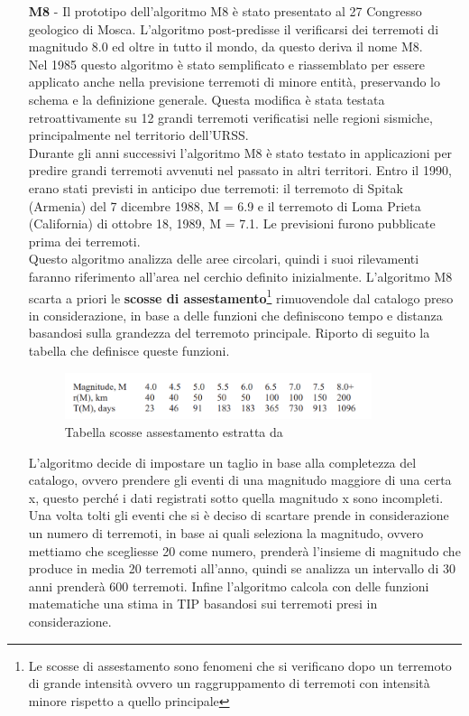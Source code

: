 \begin{itemize}
    \item[\textbf{M8} -] Il prototipo dell'algoritmo M8 \`e stato presentato al 27 Congresso geologico di Mosca.
L'algoritmo post-predisse il verificarsi dei terremoti di magnitudo 8.0 ed oltre in tutto il mondo, da questo deriva il nome M8.\\
Nel 1985 questo algoritmo \`e stato semplificato e riassemblato per essere applicato anche nella previsione terremoti di minore entit\`a, preservando lo schema e la definizione generale. Questa modifica \`e stata testata retroattivamente su 12 grandi terremoti verificatisi nelle regioni sismiche, principalmente nel territorio dell'URSS.\\
Durante gli anni successivi l'algoritmo M8 \`e stato testato in applicazioni per predire grandi terremoti avvenuti nel passato in altri territori. Entro il 1990, erano stati previsti in anticipo due terremoti: il terremoto di Spitak (Armenia) del 7 dicembre 1988, M = 6.9 e il terremoto di Loma Prieta (California) di ottobre 18, 1989, M = 7.1. Le previsioni furono pubblicate prima dei terremoti. \cite{algortimoM8}\\
Questo algoritmo analizza delle aree circolari, quindi i suoi rilevamenti faranno riferimento all'area nel cerchio definito inizialmente. L'algoritmo M8 scarta a priori le \textbf{scosse di assestamento}\footnote{Le scosse di assestamento sono fenomeni che si verificano dopo un terremoto di grande intensit\`a ovvero un raggruppamento di terremoti con intensit\`a minore rispetto a quello principale} rimuovendole dal catalogo preso in considerazione, in base a delle funzioni che definiscono tempo e distanza basandosi sulla grandezza del terremoto principale. Riporto di seguito la tabella che definisce queste funzioni.

\begin{figure}[H]
   \centering
   \includegraphics[width=0.850\textwidth]{images/TabellaScosseAssestamento.png}
   \caption{Tabella scosse assestamento estratta da \cite{M8Manual}}
   \label{img:tabellaScosseAssestamento}
\end{figure}

L'algoritmo decide di impostare un taglio in base alla completezza del catalogo, ovvero prendere gli eventi di una magnitudo maggiore di una certa x, questo perch\'e i dati registrati sotto quella magnitudo x sono incompleti. Una volta tolti gli eventi che si \`e deciso di scartare prende in considerazione un numero di terremoti, in base ai quali seleziona la magnitudo, ovvero mettiamo che scegliesse 20 come numero, prender\`a l'insieme di magnitudo che produce in media 20 terremoti all'anno, quindi se analizza un intervallo di 30 anni prender\`a 600 terremoti. Infine l'algoritmo calcola con delle funzioni matematiche una stima in TIP basandosi sui terremoti presi in considerazione. \cite{M8Manual}


\end{itemize}
